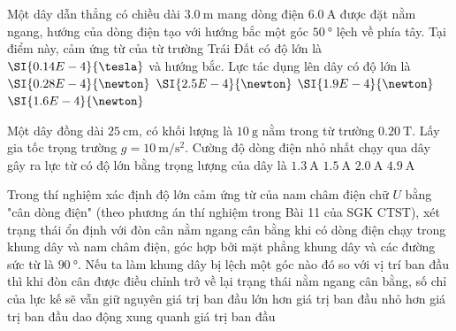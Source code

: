 \begin{ex}
Một dây dẫn thẳng có chiều dài $\SI{3.0}{\meter}$ mang dòng điện $\SI{6.0}{\ampere}$ được đặt nằm ngang, hướng của dòng điện tạo với hướng bắc một góc $\SI{50}{\degree}$ lệch về phía tây. Tại điểm này, cảm ứng từ của từ trường Trái Đất có độ lớn là $\SI{0.14E-4}{\tesla}$ và hướng bắc. Lực tác dụng lên dây có độ lớn là
	\choice
	{$\SI{0.28E-4}{\newton}$}
	{$\SI{2.5E-4}{\newton}$}
	{$\SI{1.9E-4}{\newton}$}
	{\True $\SI{1.6E-4}{\newton}$}
\end{ex}
\begin{ex}
Một dây đồng dài $\SI{25}{\centi\meter}$, có khối lượng là $\SI{10}{\gram}$ nằm trong từ trường $\SI{0.20}{\tesla}$. Lấy gia tốc trọng trường $g=\SI{10}{\meter/\second^2}$. Cường độ dòng điện nhỏ nhất chạy qua dây gây ra lực từ có độ lớn bằng trọng lượng của dây là
	\choice
	{$\SI{1.3}{\ampere}$}
	{$\SI{1.5}{\ampere}$}
	{\True $\SI{2.0}{\ampere}$}
	{$\SI{4.9}{\ampere}$}
\end{ex}
\begin{ex}
Trong thí nghiệm xác định độ lớn cảm ứng từ của nam châm điện chữ $U$ bằng "cân dòng điện" (theo phương án thí nghiệm trong Bài 11 của SGK CTST), xét trạng thái ổn định với đòn cân nằm ngang cân bằng khi có dòng điện chạy trong khung dây và nam châm điện, góc hợp bởi mặt phẳng khung dây và các đường sức từ là $\SI{90}{\degree}$. Nếu ta làm khung dây bị lệch một góc nào đó so với vị trí ban đầu thì khi đòn cân được điều chỉnh trở về lại trạng thái nằm ngang cân bằng, số chỉ của lực kế sẽ	
	\choice
	{vẫn giữ nguyên giá trị ban đầu}
	{lớn hơn giá trị ban đầu}
	{\True nhỏ hơn giá trị ban đầu}
	{dao động xung quanh giá trị ban đầu}
\end{ex}


